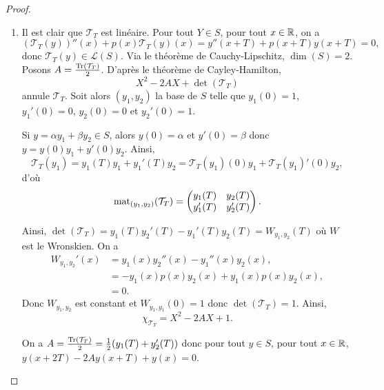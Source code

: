 \documentclass[12pt]{article}
\begin{document}
\begin{proof}
	\phantom{}
	\begin{enumerate}
		\item Il est clair que $\mathcal{T}_{T}$ est linéaire. Pour tout $Y\in S$, pour tout $x\in\mathbb{R}$, on a 
		\begin{equation}
			(\mathcal{T}_{T}(y))''(x)+p(x)\mathcal{T}_{T}(y)(x)=y''(x+T)+p(x+T)y(x+T)=0,
		\end{equation}
		donc $\mathcal{T}_{T}(y)\in\mathcal{L}(S)$. Via le théorème de Cauchy-Lipschitz, $\dim(S)=2$. Posons $A=\frac{\operatorname{Tr}(\mathcal{T}_T)}{2}$. D'après le théorème de Cayley-Hamilton, 
		\begin{equation}
			X^{2}-2AX+\det(\mathcal{T}_T)
		\end{equation}
		annule $\mathcal{T}_T$. Soit alors $(y_1,y_2)$ la base de $S$ telle que $y_1(0)=1$, $y_1'(0)=0$, $y_2(0)=0$ et $y_2'(0)=1$.

		Si $y=\alpha y_1+\beta y_2\in S$, alors $y(0)=\alpha$ et $y'(0)=\beta$ donc $y=y(0)y_1+y'(0)y_2$. Ainsi, 
		\begin{equation}
			\mathcal{T}_T(y_1)=y_1(T)y_1+y_1'(T)y_2=\mathcal{T}_T(y_1)(0) y_1+\mathcal{T}_T(y_1)'(0) y_2,
		\end{equation}
		d'où 
		\begin{equation}
			\operatorname{mat}_{(y_1,y_2)}(\mathcal{T}_T)=\begin{pmatrix}
				y_{1}(T) & y_2(T)\\
				y_1'(T) & y_2'(T)
			\end{pmatrix}.
		\end{equation}

		Ainsi, $\det(\mathcal{T}_{T})=y_1(T)y_2'(T)-y_1'(T)y_2(T)=W_{y_1,y_2}(T)$ où $W$ est le Wronskien. On a 
		\begin{align}
			W_{y_1,y_2}'(x)
			&=y_1(x)y_2''(x)-y_1''(x)y_2(x),\\
			&=-y_1(x)p(x)y_2(x)+y_1(x)p(x)y_2(x),\\
			&=0.
		\end{align}
		Donc $W_{y_1,y_2}$ est constant et $W_{y_1,y_1}(0)=1$ donc $\det(\mathcal{T}_T)=1$. Ainsi, 
		\begin{equation}
			\chi_{\mathcal{T}_T}=X^{2}-2AX+1.
		\end{equation}

		On a $A=\frac{\operatorname{Tr}(\mathcal{T}_T)}{2}=\frac{1}{2}(y_1(T)+y_2'(T))$ donc pour tout $y\in S$, pour tout $x\in\mathbb{R}$, $y(x+2T)-2Ay(x+T)+y(x)=0$.


\end{enumerate}
\end{proof}
\end{document}
